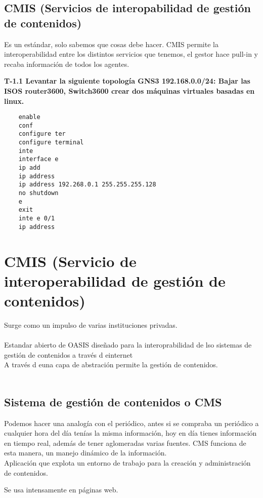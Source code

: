 \subsection{CMIS (Servicios de interopabilidad de gestión de contenidos)}
Es un estándar, solo sabemos que cosas debe hacer. CMIS permite la interoperabilidad entre los distintos servicios que tenemos, el gestor hace pull-in y recaba información de todos los agentes.

\textbf{T-1.1 Levantar la siguiente topología GNS3 192.168.0.0/24: Bajar las ISOS router3600, Switch3600 crear dos máquinas virtuales basadas en linux. }
\begin{lstlisting}
    enable
    conf 
    configure ter 
    configure terminal 
    inte
    interface e 
    ip add 
    ip address
    ip address 192.268.0.1 255.255.255.128
    no shutdown
    e
    exit
    inte e 0/1
    ip address  
\end{lstlisting}

\section{CMIS (Servicio de interoperabilidad de gestión de contenidos)}
Surge como un impulso de varias instituciones privadas.\\\\

Estandar abierto de OASIS diseñado para la interoprabilidad de lso sistemas de gestión de contenidos a través d einternet\\

A través d euna capa de abstración permite la gestión de contenidos.\\\\

\subsection{Sistema de gestión de contenidos o CMS}
Podemos hacer una analogía con el periódico, antes si se compraba un periódico a cualquier hora del día tenías la misma información, hoy en día tienes información en tiempo real, además de tener aglomeradas varias fuentes. CMS funciona de esta manera, un manejo dinámico de la información.\\

Aplicación que explota un entorno de trabajo para la creación y administración de contenidos.

Se usa intensamente en páginas web.

